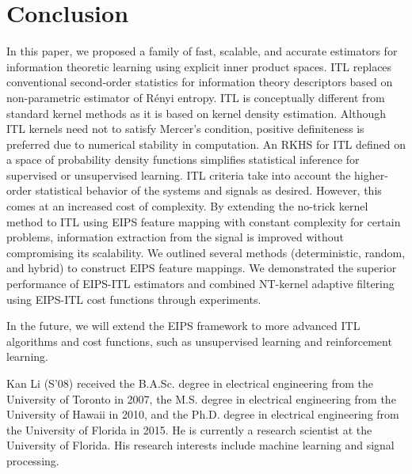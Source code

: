\documentclass[8pt,twocolumn]{IEEEtran}
\begin{document}
\section{Conclusion}\label{Sec:Conclusion}
In this paper, we proposed a family of fast, scalable, and accurate estimators for information theoretic learning using explicit inner product spaces. ITL replaces conventional second-order statistics for information theory descriptors based on non-parametric estimator of R\'{e}nyi entropy. ITL is conceptually different from standard kernel methods as it is based on kernel density estimation. Although ITL kernels need not to satisfy Mercer's condition, positive definiteness is preferred due to numerical stability in computation. An RKHS for ITL defined on a space of probability density functions simplifies statistical inference for supervised or unsupervised learning. ITL criteria take into account the higher-order statistical behavior of the systems and signals as desired. However, this comes at an increased cost of complexity. By extending the no-trick kernel method to ITL using EIPS feature mapping with constant complexity for certain problems, information extraction from the signal is improved without compromising its scalability. We outlined several methods (deterministic, random, and hybrid) to construct EIPS feature mappings. We demonstrated the superior performance of EIPS-ITL estimators and combined NT-kernel adaptive filtering using EIPS-ITL cost functions through experiments.

In the future, we will extend the EIPS framework to more advanced ITL algorithms and cost functions, such as unsupervised learning and reinforcement learning.


{}
\begin{IEEEbiography}
{Kan Li} (S'08) received the B.A.Sc. degree in electrical engineering from the University of Toronto in 2007, the M.S. degree in electrical engineering from the University of Hawaii in 2010, and the Ph.D. degree in electrical engineering from the University of Florida in 2015.  He is currently a research scientist at the University of Florida. His research interests include machine learning and signal processing.
\end{IEEEbiography}
	
\end{document}
